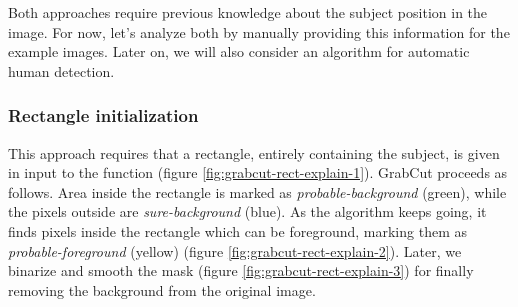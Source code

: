 \medskip

Both approaches require previous knowledge about the subject position in the image. For now, let’s analyze both by manually providing this information for the example images. Later on, we will also consider an algorithm for automatic human detection.


\subsubsection{Rectangle initialization}
\label{subsec:masking-grabcut-rect}

This approach requires that a rectangle, entirely containing the subject, is given in input to the function (figure \ref{fig:grabcut-rect-explain-1}). GrabCut proceeds as follows. Area inside the rectangle is marked as \textit{probable-background} (green), while the pixels outside are \textit{sure-background} (blue). As the algorithm keeps going, it finds pixels inside the rectangle which can be foreground, marking them as \textit{probable-foreground} (yellow) (figure \ref{fig:grabcut-rect-explain-2}). Later, we binarize and smooth the mask (figure \ref{fig:grabcut-rect-explain-3}) for finally removing the background from the original image.

